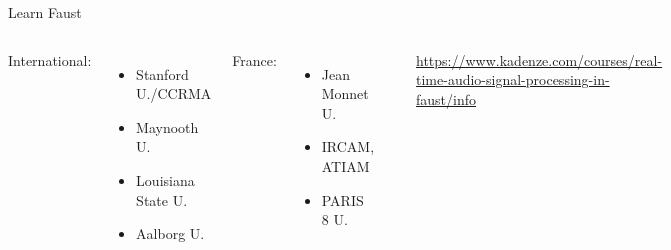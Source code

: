 
\begin{frame}[fragile]{Learn Faust}

	\begin{columns}
		
			International:
			\begin{itemize}
			\item Stanford U./CCRMA
			\item Maynooth U.
			\item Louisiana State U.
			\item Aalborg U.
			\end{itemize}
			France:
			\begin{itemize}
				\item Jean Monnet U.
				\item IRCAM, ATIAM
				\item PARIS 8 U.
			\end{itemize}

			\includegraphics[height=0.4\textheight]{images/kadenze.png}

			\href{https://www.kadenze.com/courses/real-time-audio-signal-processing-in-faust/info}{https://www.kadenze.com/courses/real-time-audio-signal-processing-in-faust/info}
	\end{columns}

\end{frame}

